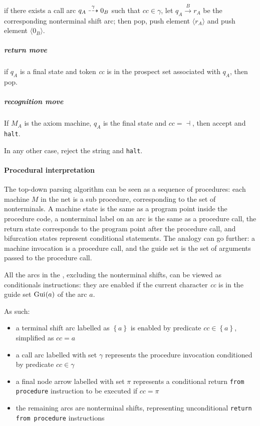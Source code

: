 \documentclass[english]{article}
\begin{document}
if there exists a call arc \(q_A \stackrel{\gamma}{\dashrightarrow} 0_B\) such that \(\textit{cc} \in \gamma\), let \(q_A \xrightarrow{B} r_A\) be the corresponding nonterminal shift arc;
then pop, push element \(\langle r_A \rangle\) and push element \(\langle 0_B \rangle\).

\subparagraph*{return move}

if \(q_A\) is a final state and token \textit{cc} is in the prospect set associated with \(q_A\), then pop.

\subparagraph*{recognition move}

If \(M_A\) is the axiom machine, \(q_A\) is the final state and \(\textit{cc} = \dashv\), then accept and \texttt{halt}.

In any other case, reject the string and \texttt{halt}.

\paragraph{Procedural interpretation}

The top-down parsing algorithm can be seen as a sequence of procedures:
each machine \(M\) in the net is a sub procedure, corresponding to the set of nonterminals.
A machine state is the same as a program point inside the procedure code, a nonterminal label on an arc is the same as a procedure call, the return state corresponds to the program point after the procedure call, and bifurcation states represent conditional statements.
The analogy can go further: a machine invocation is a procedure call, and the guide set is the set of arguments passed to the procedure call.

\bigskip
All the arcs in the \PCFG, excluding the nonterminal shifts, can be viewed as conditionals instructions:
they are enabled if the current character \textit{cc} is in the guide set \(\text{Gui}\hspace{0.1ex}(a)\) of the arc \(a\).

As such:

\begin{itemize}
  \item a terminal shift arc labelled as \(\left\{ a \right\}\) is enabled by predicate \(\textit{cc} \in \left\{ a \right\}\), simplified as \(\textit{cc}=a\)
  \item a call arc labelled with set \(\gamma\) represents the procedure invocation conditioned by predicate \(\textit{cc} \in \gamma\)
  \item a final node arrow labelled with set \(\pi\) represents a conditional return \texttt{from procedure} instruction to be executed if \(\textit{cc}=\pi\)
  \item the remaining \PCFG arcs are nonterminal shifts, representing unconditional \texttt{return from procedure} instructions
\end{itemize}
\end{document}
